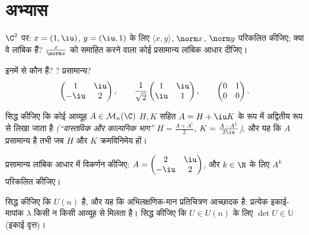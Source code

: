 \section{अभ्यास}

\begin{exercise}[$\star$]\label{exo:b2:hermitian:1}
$\C^2$ पर: $x = (1, \iu)$, $y = (\iu, 1)$ के लिए $\langle x, y\rangle$, $\norm x$, $\norm y$ परिकलित कीजिए; क्या वे लांबिक हैं?
$\frac{x}{\norm x}$ को समाहित करने वाला कोई प्रसामान्य लांबिक आधार दीजिए।
\end{exercise}

\begin{exercise}[$\star$]\label{exo:b2:hermitian:2}
इनमें से कौन  हैं? ? प्रसामान्य?
\[
\begin{pmatrix} 1 & \iu\\ -\iu & 2 \end{pmatrix},
\qquad
\frac{1}{\sqrt2}\begin{pmatrix} 1 & \iu\\ \iu & 1\end{pmatrix},
\qquad
\begin{pmatrix} 0 & 1\\ 0 & 0 \end{pmatrix}.
\]
\end{exercise}

\begin{exercise}[$\star$]\label{exo:b2:hermitian:3}
सिद्ध कीजिए कि कोई आव्यूह $A \in \mathcal{M}_n(\C)$  $H, K$ सहित $A =
H + \iu K$ के रूप में अद्वितीय
रूप से लिखा जाता है \emph{(``वास्तविक और काल्पनिक भाग'' $H = \frac{A + A^\dagger}{2}$, $K = \frac{A -
A^\dagger}{2\iu}$)}, और यह
कि $A$ प्रसामान्य है तभी जब $H$ और $K$ क्रमविनिमेय हों।
\end{exercise}

\begin{exercise}[$\star\star$]\label{exo:b2:hermitian:4}
प्रसामान्य लांबिक आधार में विकर्णन कीजिए: $A = \begin{pmatrix} 2 & \iu\\
-\iu & 2\end{pmatrix}$, और $k \in \N$ के लिए $A^k$ परिकलित
कीजिए।
\end{exercise}

\begin{exercise}[$\star\star$]\label{exo:b2:hermitian:5}
सिद्ध कीजिए कि $U(n)$  है, और यह कि अभिलक्षणिक-मान प्रतिचित्रण आच्छादक
है: प्रत्येक इकाई-मापांक $\lambda$ किसी न किसी  आव्यूह से मिलता है। सिद्ध
कीजिए कि $U \in
U(n)$ के लिए $\det U \in \mathbb{U}$ (इकाई वृत्त)।
\end{exercise}

